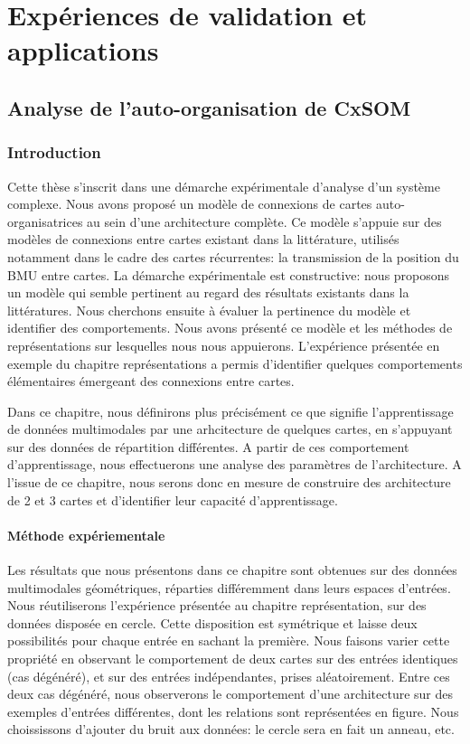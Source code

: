 \part{Expériences de validation et applications}
\chapter{Analyse de l'auto-organisation de CxSOM}\label{chap:analyse}
\graphicspath{{06-Analyse/}}
\minitoc

\section{Introduction}

Cette thèse s'inscrit dans une démarche expérimentale d'analyse d'un système complexe.
Nous avons proposé un modèle de connexions de cartes auto-organisatrices au sein d'une architecture complète.
Ce modèle s'appuie sur des modèles de connexions entre cartes existant dans la littérature, utilisés notamment dans le cadre des cartes récurrentes: la transmission de la position du BMU entre cartes.
La démarche expérimentale est constructive: nous proposons un modèle qui semble pertinent au regard des résultats existants dans la littératures. Nous cherchons ensuite à évaluer la pertinence du modèle et identifier des comportements.
Nous avons présenté ce modèle et les méthodes de représentations sur lesquelles nous nous appuierons.
L'expérience présentée en exemple du chapitre représentations a permis d'identifier quelques comportements élémentaires émergeant des connexions entre cartes.

Dans ce chapitre, nous définirons plus précisément ce que signifie l'apprentissage de données multimodales par une arhcitecture de quelques cartes, en s'appuyant sur des données de répartition différentes.
A partir de ces comportement d'apprentissage, nous effectuerons une analyse des paramètres de l'architecture.
A l'issue de ce chapitre, nous serons donc en mesure de construire des architecture de 2 et 3 cartes et d'identifier leur capacité d'apprentissage.

\subsection{Méthode expériementale}

Les résultats que nous présentons dans ce chapitre sont obtenues sur des données multimodales géométriques, réparties différemment dans leurs espaces d'entrées.
Nous réutiliserons l'expérience présentée au chapitre représentation, sur des données disposée en cercle. Cette disposition est symétrique et laisse deux possibilités pour chaque entrée en sachant la première.
Nous faisons varier cette propriété en observant le comportement de deux cartes sur des entrées identiques (cas dégénéré), et sur des entrées indépendantes, prises aléatoirement. Entre ces deux cas dégénéré, nous observerons le comportement d'une architecture sur des exemples d'entrées différentes, dont les relations sont représentées en figure.
Nous choississons d'ajouter du bruit aux données: le cercle sera en fait un anneau, etc.

